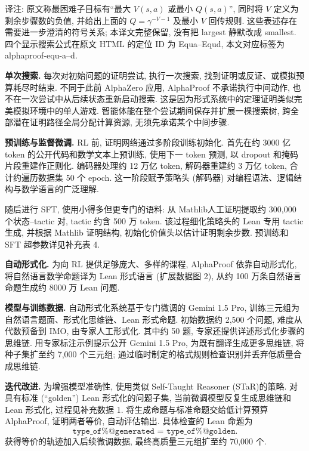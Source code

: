 \begin{remark}
译注: 原文称最困难子目标有“最大 $V(s,a)$ 或最小 $Q(s,a)$”, 同时将 $V$ 定义为剩余步骤数的负值, 并给出上面的 $Q=\gamma^{-V-1}$ 及最小 $V$ 回传规则. 这些表述存在需要进一步澄清的符号关系; 本译文完整保留, 没有把 largest 静默改成 smallest. 四个显示搜索公式在原文 HTML 的定位 ID 为 Equa--Equd, 本文对应标签为 alphaproof-equ-a--d.
\end{remark}

\noindent\textbf{单次搜索.} 每次对初始问题的证明尝试, 执行一次搜索, 找到证明或反证、或模拟预算耗尽时结束. 不同于此前 AlphaZero 应用, AlphaProof 不承诺执行中间动作, 也不在一次尝试中从后续状态重新启动搜索. 这是因为形式系统中的定理证明类似完美模拟环境中的单人游戏. 智能体能在整个尝试期间保存并扩展一棵搜索树, 跨全部潜在证明路径全局分配计算资源, 无须先承诺某个中间步骤.

\label{alphaproof-methods-training}
\noindent\textbf{预训练与监督微调.} RL 前, 证明网络通过多阶段训练初始化. 首先在约 3000 亿 token 的公开代码和数学文本上预训练, 使用下一 token 预测, 以 dropout 和掩码片段重建作正则化. 编码器处理约 12 万亿 token, 解码器重建约 3 万亿 token, 合计约遍历数据集 50 个 epoch. 这一阶段赋予策略头 (解码器) 对编程语法、逻辑结构与数学语言的广泛理解.

随后进行 SFT, 使用小得多但更专门的语料: 从 Mathlib\cite{alphaproof-ref4}人工证明提取约 300,000 个状态--tactic 对, tactic 约含 500 万 token. 该过程细化策略头的 Lean 专用 tactic 生成, 并根据 Mathlib 证明结构, 初始化价值头以估计证明剩余步数. 预训练和 SFT 超参数详见补充表 4.

\noindent\textbf{自动形式化.} 为向 RL 提供足够庞大、多样的课程, AlphaProof 依靠自动形式化, 将自然语言数学命题译为 Lean 形式语言 (扩展数据图 2), 从约 100 万条自然语言命题生成约 8000 万 Lean 问题.

\noindent\textbf{模型与训练数据.} 自动形式化系统基于专门微调的 Gemini 1.5 Pro, 训练三元组为自然语言题面、形式化思维链、Lean 形式命题. 初始数据约 2,500 个问题, 难度从代数预备到 IMO, 由专家人工形式化. 其中约 50 题, 专家还提供详述形式化步骤的思维链. 用专家标注示例提示公开 Gemini 1.5 Pro, 为既有翻译生成更多思维链, 将种子集扩至约 7,000 个三元组; 通过临时制定的格式规则检查识别并丢弃低质量合成思维链.

\noindent\textbf{迭代改进.} 为增强模型准确性, 使用类似 Self-Taught Reasoner (STaR)\cite{alphaproof-ref60}的策略. 对具有标准 (“golden”) Lean 形式化的问题子集, 当前微调模型反复生成思维链和 Lean 形式化, 过程见补充数据 1. 将生成命题与标准命题交给低计算预算 AlphaProof, 证明两者等价, 自动评估输出. 具体检查的 Lean 命题为
\[
\texttt{type\_of\% @generated = type\_of\% @golden}.
\]
获得等价的轨迹加入后续微调数据, 最终高质量三元组扩至约 70,000 个.

